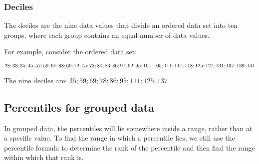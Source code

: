 \subsubsection*{Deciles}
The deciles are the nine data values that divide an ordered data set into ten groups, where each group contains an equal number of data values.
\par
For example, consider the ordered data set:
\begin{center}
$28; 33; 35; 45; 57; 59; 61; 68; 69; 72; 75; 78; 80; 83; 86; 91; 92; \\
95; 101; 105; 111; 117; 118; 125; 127; 131; 137; 139; 141$\\
\end{center}
The nine deciles are: $35; 59; 69; 78; 86; 95; 111; 125; 137$


\subsection{Percentiles for grouped data}

In grouped data, the percentiles will lie somewhere inside a range,
rather than at a specific value. To find the range in which a
percentile lies, we still use the percentile formula to determine the
rank of the percentile and then find the range within which that rank
is.

